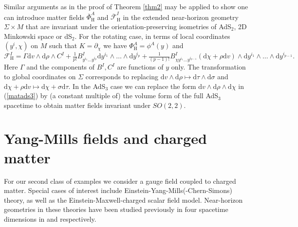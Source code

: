 \documentclass[11pt, reqno]{amsart}
\theoremstyle{plain}
\theoremstyle{definition}
\numberwithin{equation}{section}
\begin{document}
Similar arguments as in the proof of Theorem \ref{thm2} may be applied to show one can introduce matter fields $ \overline{\Phi}^A_{\text{H}}$ and $\overline{\mathcal{F}}_{\text{H}}^I$ in the extended near-horizon geometry $\Sigma \times M$ that are invariant under the orientation-preserving isometries of AdS$_2$, 2D Minkowski space or dS$_2$. For the rotating case, in terms of local coordinates $(y^i, \chi)$ on $M$ such that $K = \partial_\chi$ we have $\Phi^A_{\text{H}} = \phi^A(y)$ and
\begin{equation*}
\mathcal{F}_{\text{H}}^I = \Gamma \text{d}v \wedge \text{d}\rho \wedge C^I + \tfrac{1}{p!}B^I_{y^{i_1}\dots y^{i_p}}\text{d}y^{i_1} \wedge \dots \wedge  \text{d}y^{i_p} + \tfrac{1}{(p-1)!}B^I_{\chi y^{i_1}\dots y^{i_{p-1}}}(\text{d}\chi + \rho\text{d}v)\wedge \text{d}y^{i_1}\wedge \dots \wedge \text{d}y^{i_{p-1}}.
\end{equation*}
Here $\Gamma$ and the components of $B^I,C^I$ are functions of $y$ only. The transformation to global coordinates on $\Sigma$ corresponds to replacing $\text{d}v \wedge \text{d}\rho \mapsto \text{d}\tau \wedge \text{d}\sigma$ and $\text{d}\chi + \rho\text{d}v \mapsto \text{d}\chi + \sigma\text{d}\tau$. In the AdS$_3$ case we can replace the form $\text{d}v \wedge \text{d}\rho \wedge \text{d}\chi$ in (\ref{matads3}) by (a constant multiple of) the volume form of the full AdS$_3$ spacetime to obtain matter fields invariant under $SO(2,2)$.


\section{Yang-Mills fields and charged matter} \label{gsec} 
For our second class of examples we consider a gauge field coupled to charged matter. Special cases of interest include Einstein-Yang-Mills(-Chern-Simons) theory, as well as the Einstein-Maxwell-charged scalar field model. Near-horizon geometries in these theories have been studied previously in four spacetime dimensions in \cite{LL13} and \cite{LL16} respectively.
\end{document}
